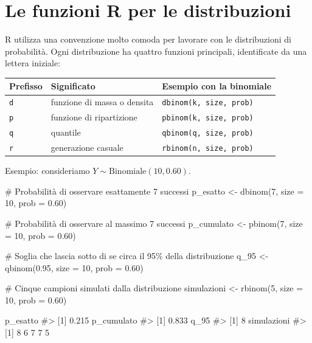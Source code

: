 \documentclass[
  italian,
  letterpaper,
  a4paper,
  11pt,
  open=any]{scrbook}
\newenvironment{Shaded}{\begin{snugshade}}{\end{snugshade}}
\newcommand{\AttributeTok}[1]{\textcolor[rgb]{0.40,0.45,0.13}{#1}}
\newcommand{\CommentTok}[1]{\textcolor[rgb]{0.37,0.37,0.37}{#1}}
\newcommand{\DecValTok}[1]{\textcolor[rgb]{0.68,0.00,0.00}{#1}}
\newcommand{\FloatTok}[1]{\textcolor[rgb]{0.68,0.00,0.00}{#1}}
\newcommand{\FunctionTok}[1]{\textcolor[rgb]{0.28,0.35,0.67}{#1}}
\newcommand{\NormalTok}[1]{\textcolor[rgb]{0.00,0.23,0.31}{#1}}
\newcommand{\OtherTok}[1]{\textcolor[rgb]{0.00,0.23,0.31}{#1}}
\newcounter{none} %
\theoremstyle{plain}
\theoremstyle{definition}
\theoremstyle{definition}
\theoremstyle{remark}
\begin{document}
\section{Le funzioni R per le
distribuzioni}\label{sec-r-discrete-functions}

R utilizza una convenzione molto comoda per lavorare con le
distribuzioni di probabilità. Ogni distribuzione ha quattro funzioni
principali, identificate da una lettera iniziale:

{\def\LTcaptype{none} %
\begin{longtable}[]{@{}lll@{}}
\toprule\noalign{}
Prefisso & Significato & Esempio con la binomiale \\
\midrule\noalign{}
\endhead
\bottomrule\noalign{}
\endlastfoot
\texttt{d} & funzione di massa o densita &
\texttt{dbinom(k,\ size,\ prob)} \\
\texttt{p} & funzione di ripartizione &
\texttt{pbinom(k,\ size,\ prob)} \\
\texttt{q} & quantile & \texttt{qbinom(q,\ size,\ prob)} \\
\texttt{r} & generazione casuale & \texttt{rbinom(n,\ size,\ prob)} \\
\end{longtable}
}

Esempio: consideriamo \(Y \sim \mathrm{Binomiale}(10, 0.60)\).

\begin{Shaded}
\begin{Highlighting}[]
\CommentTok{\# Probabilità di osservare esattamente 7 successi}
\NormalTok{p\_esatto }\OtherTok{\textless{}{-}} \FunctionTok{dbinom}\NormalTok{(}\DecValTok{7}\NormalTok{, }\AttributeTok{size =} \DecValTok{10}\NormalTok{, }\AttributeTok{prob =} \FloatTok{0.60}\NormalTok{)}

\CommentTok{\# Probabilità di osservare al massimo 7 successi}
\NormalTok{p\_cumulato }\OtherTok{\textless{}{-}} \FunctionTok{pbinom}\NormalTok{(}\DecValTok{7}\NormalTok{, }\AttributeTok{size =} \DecValTok{10}\NormalTok{, }\AttributeTok{prob =} \FloatTok{0.60}\NormalTok{)}

\CommentTok{\# Soglia che lascia sotto di se circa il 95\% della distribuzione}
\NormalTok{q\_95 }\OtherTok{\textless{}{-}} \FunctionTok{qbinom}\NormalTok{(}\FloatTok{0.95}\NormalTok{, }\AttributeTok{size =} \DecValTok{10}\NormalTok{, }\AttributeTok{prob =} \FloatTok{0.60}\NormalTok{)}

\CommentTok{\# Cinque campioni simulati dalla distribuzione}
\NormalTok{simulazioni }\OtherTok{\textless{}{-}} \FunctionTok{rbinom}\NormalTok{(}\DecValTok{5}\NormalTok{, }\AttributeTok{size =} \DecValTok{10}\NormalTok{, }\AttributeTok{prob =} \FloatTok{0.60}\NormalTok{)}

\NormalTok{p\_esatto}
\CommentTok{\#\textgreater{} [1] 0.215}
\NormalTok{p\_cumulato}
\CommentTok{\#\textgreater{} [1] 0.833}
\NormalTok{q\_95}
\CommentTok{\#\textgreater{} [1] 8}
\NormalTok{simulazioni}
\CommentTok{\#\textgreater{} [1] 8 6 7 7 5}
\end{Highlighting}
\end{Shaded}
\end{document}
